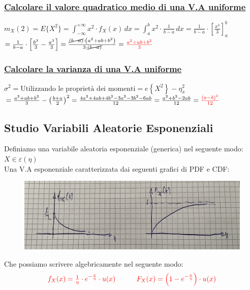 \documentclass{article}
\begin{document}
\subsubsection{\underline{Calcolare il valore quadratico medio di una V.A uniforme}}
$m_X(2) = E \big\{ X^2 \big\} = \int_{-\infty}^{+\infty} x^2 \cdot f_X(x) \,dx = \int_{a}^{b} x^2 \cdot \frac{1}{b-a} \,dx = \frac{1}{b-a} \cdot \left[\frac{x^3}{3}\right]_a^b$ \\ 
$= \frac{1}{b-a} \cdot \left[\frac{b^3}{3} - \frac{a^3}{3}\right] = \frac{\cancel{(b-a)} \cdot \left( a^2 + ab + b^2 \right) }{ 3 \cdot \cancel{(b-a)}} = \color{red}\frac{a^2 + ab + b^2}{3}$
\subsubsection{\underline{Calcolare la varianza di una V.A uniforme}}
$\sigma^2 = \text{Utilizzando le proprietà dei momenti} = e \left\{ X^2 \right\} - \eta_x^2$ \\
$= \frac{a^2 + ab + b^2}{3} - \left( \frac{b+a}{2} \right)^2 = \frac{4a^2 + 4ab + 4b^2 - 3a^2 - 3b^2 - 6ab}{12} = \frac{a^2+b^2-2ab}{12} = \color{red} \frac{(a-b)^2}{12}$

\subsection{Studio Variabili Aleatorie Esponenziali}
Definiamo una variabile aleatoria esponenziale (generica) nel seguente modo: $X \in \varepsilon \left( \eta \right)$ \\
Una V.A esponenziale caratterizzata dai seguenti grafici di PDF e CDF: 
\begin{figure}[H]
\centering
\includegraphics[scale=0.12]{images/61.V.A.Exp.jpeg}
\end{figure}
Che possiamo scrivere algebricamente nel seguente modo:
\[\color{red}
\begin{matrix}
f_X(x) = \frac 1 \eta \cdot e^{-\frac x \eta} \cdot u(x)
&&&
F_X(x) = \left( 1 - e^{- \frac x \eta } \right) \cdot u(x)
\end{matrix}\]
\end{document}
